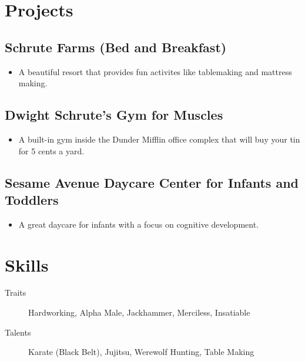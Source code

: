 \documentclass{article}
\begin{document}
\section{\faFlask\enspace Projects}

\subsection{Schrute Farms (Bed and Breakfast)}
\begin{itemize}
  \item A beautiful resort that provides fun activites like tablemaking and mattress making.
\end{itemize}

\subsection{Dwight Schrute’s Gym for Muscles}
\begin{itemize}
  \item A built-in gym inside the Dunder Mifflin office complex that will buy your tin for 5 cents a yard.
\end{itemize}

\subsection{Sesame Avenue Daycare Center for Infants and Toddlers}
\begin{itemize}
  \item A great daycare for infants with a focus on cognitive development.
\end{itemize}


\section{\faCogs\enspace Skills}
\begin{description}
  \item[Traits] Hardworking, Alpha Male, Jackhammer, Merciless, Insatiable
  \item[Talents] Karate (Black Belt), Jujitsu, Werewolf Hunting, Table Making 
\end{description}
\end{document}
